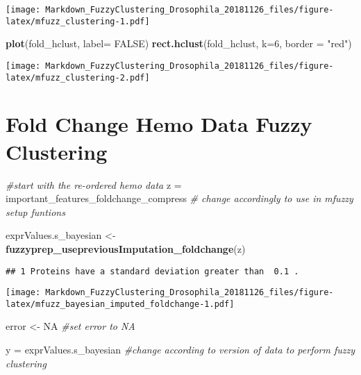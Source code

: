 \documentclass[]{article}
\newenvironment{Shaded}{\begin{snugshade}}{\end{snugshade}}
\newcommand{\KeywordTok}[1]{\textcolor[rgb]{0.13,0.29,0.53}{\textbf{#1}}}
\newcommand{\DataTypeTok}[1]{\textcolor[rgb]{0.13,0.29,0.53}{#1}}
\newcommand{\DecValTok}[1]{\textcolor[rgb]{0.00,0.00,0.81}{#1}}
\newcommand{\StringTok}[1]{\textcolor[rgb]{0.31,0.60,0.02}{#1}}
\newcommand{\CommentTok}[1]{\textcolor[rgb]{0.56,0.35,0.01}{\textit{#1}}}
\newcommand{\OtherTok}[1]{\textcolor[rgb]{0.56,0.35,0.01}{#1}}
\newcommand{\NormalTok}[1]{#1}
\begin{document}
\texttt{[image: Markdown\_FuzzyClustering\_Drosophila\_20181126\_files/figure-latex/mfuzz\_clustering-1.pdf]}

\begin{Shaded}
\begin{Highlighting}[]
\KeywordTok{plot}\NormalTok{(fold_hclust, }\DataTypeTok{label=} \OtherTok{FALSE}\NormalTok{)}
\KeywordTok{rect.hclust}\NormalTok{(fold_hclust, }\DataTypeTok{k=}\DecValTok{6}\NormalTok{, }\DataTypeTok{border =} \StringTok{"red"}\NormalTok{)}
\end{Highlighting}
\end{Shaded}

\texttt{[image: Markdown\_FuzzyClustering\_Drosophila\_20181126\_files/figure-latex/mfuzz\_clustering-2.pdf]}

\section{Fold Change Hemo Data Fuzzy
Clustering}\label{fold-change-hemo-data-fuzzy-clustering}

\begin{Shaded}
\begin{Highlighting}[]
\CommentTok{#start with the re-ordered hemo data}
\NormalTok{z =}\StringTok{ }\NormalTok{important_features_foldchange_compress }\CommentTok{# change accordingly to use in mfuzzy setup funtions}

\NormalTok{exprValues.s_bayesian <-}\StringTok{ }\KeywordTok{fuzzyprep_usepreviousImputation_foldchange}\NormalTok{(z)}
\end{Highlighting}
\end{Shaded}

\begin{verbatim}
## 1 Proteins have a standard deviation greater than  0.1 .
\end{verbatim}

\texttt{[image: Markdown\_FuzzyClustering\_Drosophila\_20181126\_files/figure-latex/mfuzz\_bayesian\_imputed\_foldchange-1.pdf]}

\begin{Shaded}
\begin{Highlighting}[]
\NormalTok{error <-}\StringTok{ }\OtherTok{NA} \CommentTok{#set error to NA}

\NormalTok{y =}\StringTok{ }\NormalTok{exprValues.s_bayesian }\CommentTok{#change according to version of data to perform fuzzy clustering}
\end{Highlighting}
\end{Shaded}
\end{document}
